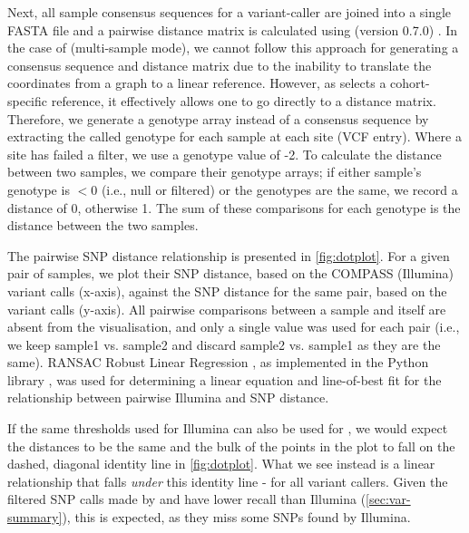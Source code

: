 Next, all sample consensus sequences for a variant-caller are joined into a single FASTA file and a pairwise distance matrix is calculated using  (version 0.7.0) \cite{snp-dists}. In the case of \compare{} (multi-sample mode), we cannot follow this approach for generating a consensus sequence and distance matrix due to the inability to translate the coordinates from a graph to a linear reference. However, as \compare{} selects a cohort-specific reference, it effectively allows one to go directly to a distance matrix. Therefore, we generate a genotype array instead of a consensus sequence by extracting the called genotype for each sample at each site (VCF entry). Where a site has failed a filter, we use a genotype value of -2. To calculate the distance between two samples, we compare their genotype arrays; if either sample's genotype is $<0$ (i.e., null or filtered) or the genotypes are the same, we record a distance of 0, otherwise 1. The sum of these comparisons for each genotype is the distance between the two samples.

The pairwise SNP distance relationship is presented in \autoref{fig:dotplot}. For a given pair of samples, we plot their SNP distance, based on the COMPASS (Illumina) variant calls (x-axis), against the SNP distance for the same pair, based on the \ont{} variant calls (y-axis). All pairwise comparisons between a sample and itself are absent from the visualisation, and only a single value was used for each pair (i.e., we keep sample1 vs. sample2 and discard sample2 vs. sample1 as they are the same). RANSAC Robust Linear Regression \cite{fischler1981}, as implemented in the Python library  \cite{scikitlearn}, was used for determining a linear equation and line-of-best fit for the relationship between pairwise Illumina and \ont{} SNP distance.

If the same thresholds used for Illumina can also be used for \ont{}, we would expect the distances to be the same and the bulk of the points in the plot to fall on the dashed, diagonal identity line in \autoref{fig:dotplot}. What we see instead is a linear relationship that falls \emph{under} this identity line - for all \ont{} variant callers. Given the filtered \ont{} SNP calls made by \bcftools{} and \pandora{} have lower recall than Illumina (\autoref{sec:var-summary}), this is expected, as they miss some SNPs found by Illumina.

